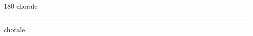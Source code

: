 
\begin{frame}
\begin{center}
\begin{turn}{180}
{\fontsize{2.5cm}{1em}\selectfont chorale}
\end{turn}
\vspace{1em}\par  
\hrule
\vspace{1em}\par  
{\fontsize{2.5cm}{1em}\selectfont chorale}
\end{center}
\end{frame}
